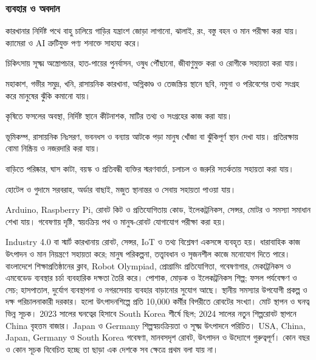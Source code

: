 \subsubsection{ব্যবহার ও অবদান}
\begin{compactpoints}
\item কারখানার নির্দিষ্ট পথে বাহু চালিয়ে গাড়ির যন্ত্রাংশ জোড়া লাগানো, ঝালাই, রং, বস্তু বহন ও মান পরীক্ষা করা যায়। ক্যামেরা ও AI ত্রুটিযুক্ত পণ্য শনাক্তে সাহায্য করে।
\item চিকিৎসায় সূক্ষ্ম অস্ত্রোপচার, হাত-পায়ের পুনর্বাসন, ওষুধ পৌঁছানো, জীবাণুমুক্ত করা ও রোগীকে সহায়তা করা যায়।
\item মহাকাশ, গভীর সমুদ্র, খনি, রাসায়নিক কারখানা, অগ্নিকাণ্ড ও তেজস্ক্রিয় স্থানে ছবি, নমুনা ও পরিবেশের তথ্য সংগ্রহ করে মানুষের ঝুঁকি কমানো যায়।
\item কৃষিতে ফসলের অবস্থা, নির্দিষ্ট স্থানে কীটনাশক, মাটির তথ্য ও সংগ্রহের কাজ করা যায়।
\item ভূমিকম্প, রাসায়নিক নিঃসরণ, ভবনধস ও বন্যায় আটকে পড়া মানুষ খোঁজা বা ঝুঁকিপূর্ণ স্থান দেখা যায়। প্রতিরক্ষায় বোমা নিষ্ক্রিয় ও নজরদারি করা যায়।
\item বাড়িতে পরিষ্কার, ঘাস কাটা, বয়স্ক ও প্রতিবন্ধী ব্যক্তির স্মরণবার্তা, চলাচল ও জরুরি সতর্কতায় সহায়তা করা যায়।
\item হোটেল ও গুদামে সরবরাহ, অর্ডার বাছাই, মজুত স্থানান্তর ও সেবায় সহায়তা পাওয়া যায়।
\item Arduino, Raspberry Pi, রোবট কিট ও প্রতিযোগিতায় কোড, ইলেকট্রনিকস, সেন্সর, মোটর ও সমস্যা সমাধান শেখা যায়। গবেষণায় দৃষ্টি, স্বয়ংক্রিয় পথ ও মানুষ-রোবট যোগাযোগ পরীক্ষা করা হয়।
\end{compactpoints}
Industry 4.0 বা স্মার্ট কারখানায় রোবট, সেন্সর, IoT ও তথ্য বিশ্লেষণ একসঙ্গে ব্যবহৃত হয়। ধারাবাহিক কাজ উৎপাদন ও মান নিয়ন্ত্রণে সহায়তা করে; মানুষ পরিকল্পনা, তত্ত্বাবধান ও সৃজনশীল কাজে মনোযোগ দিতে পারে।
বাংলাদেশে শিক্ষাপ্রতিষ্ঠানের ক্লাব, Robot Olympiad, প্রোগ্রামিং প্রতিযোগিতা, গবেষণাগার, মেকাট্রনিকস ও এমবেডেড ব্যবস্থার চর্চা ব্যবহারিক দক্ষতা তৈরি করে। পোশাক, মোড়ক ও ইলেকট্রনিকস শিল্প; ফসল পর্যবেক্ষণ ও সেচ; হাসপাতাল, দুর্যোগ ব্যবস্থাপনা ও নগরসেবায় ব্যবহার বাড়ানোর সুযোগ আছে। স্থানীয় সমস্যার উপযোগী প্রকল্প ও দক্ষ পরিচালনাকারী দরকার।
 হলো উৎপাদনশিল্পে প্রতি 10,000 কর্মীর বিপরীতে রোবটের সংখ্যা। মোট স্থাপন ও ঘনত্ব ভিন্ন সূচক। 2023 সালের ঘনত্বের হিসাবে South Korea শীর্ষে ছিল; 2024 সালের নতুন শিল্পরোবট স্থাপনে China বৃহত্তম বাজার। Japan ও Germany শিল্পস্বয়ংক্রিয়তা ও সূক্ষ্ম উৎপাদনে পরিচিত। USA, China, Japan, Germany ও South Korea গবেষণা, মানবসদৃশ রোবট, উৎপাদন ও উদ্যোগে গুরুত্বপূর্ণ। কোন বছর ও কোন সূচক বিবেচিত হচ্ছে তা ছাড়া এক দেশকে সব ক্ষেত্রে প্রথম বলা যায় না।
